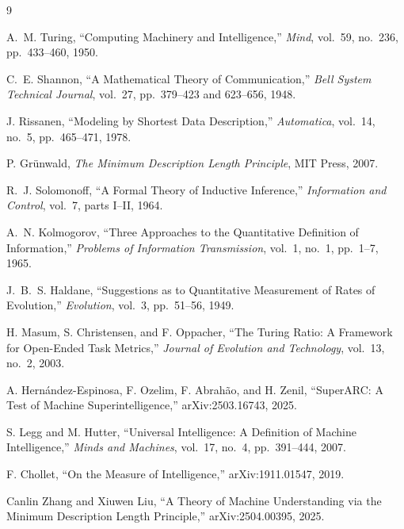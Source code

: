 \documentclass[11pt]{article}
\begin{document}
\begin{thebibliography}{9}

A.~M. Turing,
\newblock ``Computing Machinery and Intelligence,''
\newblock \emph{Mind}, vol.~59, no.~236, pp.~433--460, 1950.

C.~E. Shannon,
\newblock ``A Mathematical Theory of Communication,''
\newblock \emph{Bell System Technical Journal}, vol.~27,
pp.~379--423 and 623--656, 1948.

J. Rissanen,
\newblock ``Modeling by Shortest Data Description,''
\newblock \emph{Automatica}, vol.~14, no.~5, pp.~465--471, 1978.

P. Gr{\"u}nwald,
\newblock \emph{The Minimum Description Length Principle},
\newblock MIT Press, 2007.

R.~J. Solomonoff,
\newblock ``A Formal Theory of Inductive Inference,''
\newblock \emph{Information and Control}, vol.~7, parts I--II, 1964.

A.~N. Kolmogorov,
\newblock ``Three Approaches to the Quantitative Definition of Information,''
\newblock \emph{Problems of Information Transmission}, vol.~1, no.~1, pp.~1--7, 1965.

J.~B.~S. Haldane,
\newblock ``Suggestions as to Quantitative Measurement of Rates of Evolution,''
\newblock \emph{Evolution}, vol.~3, pp.~51--56, 1949.

H. Masum, S. Christensen, and F. Oppacher,
\newblock ``The Turing Ratio: A Framework for Open-Ended Task Metrics,''
\newblock \emph{Journal of Evolution and Technology}, vol.~13, no.~2, 2003.

A. Hern{\'a}ndez-Espinosa, F. Ozelim, F. Abrah{\~a}o, and H. Zenil,
\newblock ``SuperARC: A Test of Machine Superintelligence,''
\newblock arXiv:2503.16743, 2025.

S. Legg and M. Hutter,
\newblock ``Universal Intelligence: A Definition of Machine Intelligence,''
\newblock \emph{Minds and Machines}, vol.~17, no.~4, pp.~391--444, 2007.

F. Chollet,
\newblock ``On the Measure of Intelligence,''
\newblock arXiv:1911.01547, 2019.

Canlin Zhang and Xiuwen Liu,
\newblock ``A Theory of Machine Understanding via the Minimum Description Length Principle,''
\newblock arXiv:2504.00395, 2025.

\end{thebibliography}
\end{document}
